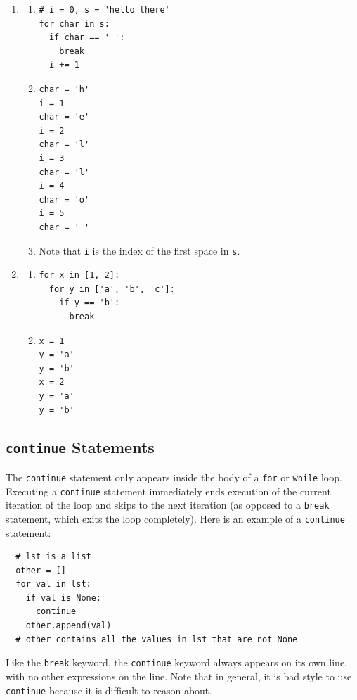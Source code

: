 \documentclass{article}
\newcommand{\expr}[1]{\texttt{#1}}
\newcommand{\kw}[1]{\expr{#1}}
\begin{document}
  \begin{enumerate}
    \item
    \begin{enumerate}
      \item
\begin{verbatim}
# i = 0, s = 'hello there'
for char in s:
  if char == ' ':
    break
  i += 1
\end{verbatim}
      \item
\begin{verbatim}
char = 'h'
i = 1
char = 'e'
i = 2
char = 'l'
i = 3
char = 'l'
i = 4
char = 'o'
i = 5
char = ' '
\end{verbatim}
      \item Note that \expr{i} is the index of the first space in \expr{s}.
    \end{enumerate}

    \item
    \begin{enumerate}
      \item
\begin{verbatim}
for x in [1, 2]:
  for y in ['a', 'b', 'c']:
    if y == 'b':
      break
\end{verbatim}
      \item
\begin{verbatim}
x = 1
y = 'a'
y = 'b'
x = 2
y = 'a'
y = 'b'
\end{verbatim}
    \end{enumerate}
  \end{enumerate}

\subsection{\kw{continue} Statements}
\label{sec:continue-statement}

  The \kw{continue} statement only appears inside the body of a \kw{for} or \kw{while} loop. Executing a \kw{continue} statement immediately ends execution of the current iteration of the loop and skips to the next iteration (as opposed to a \kw{break} statement, which exits the loop completely). Here is an example of a \kw{continue} statement:

\begin{verbatim}
  # lst is a list
  other = []
  for val in lst:
    if val is None:
      continue
    other.append(val)
  # other contains all the values in lst that are not None
\end{verbatim}

  Like the \kw{break} keyword, the \kw{continue} keyword always appears on its own line, with no other expressions on the line. Note that in general, it is bad style to use \kw{continue} because it is difficult to reason about.
\end{document}
